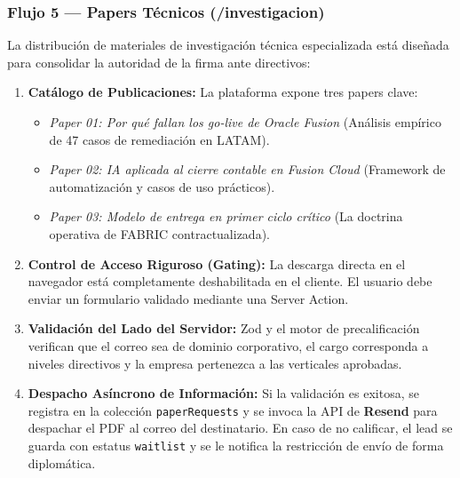 \documentclass[11pt,letterpaper]{article}
\begin{document}
\subsubsection{Flujo 5 — Papers Técnicos (/investigacion)}
La distribución de materiales de investigación técnica especializada está diseñada para consolidar la autoridad de la firma ante directivos:
\begin{enumerate}
\item \textbf{Catálogo de Publicaciones:} La plataforma expone tres papers clave:
  \begin{itemize}
  \item \emph{Paper 01: Por qué fallan los go-live de Oracle Fusion} (Análisis empírico de 47 casos de remediación en LATAM).
  \item \emph{Paper 02: IA aplicada al cierre contable en Fusion Cloud} (Framework de automatización y casos de uso prácticos).
  \item \emph{Paper 03: Modelo de entrega en primer ciclo crítico} (La doctrina operativa de FABRIC contractualizada).
  \end{itemize}
\item \textbf{Control de Acceso Riguroso (Gating):} La descarga directa en el navegador está completamente deshabilitada en el cliente. El usuario debe enviar un formulario validado mediante una Server Action.
\item \textbf{Validación del Lado del Servidor:} Zod y el motor de precalificación verifican que el correo sea de dominio corporativo, el cargo corresponda a niveles directivos y la empresa pertenezca a las verticales aprobadas.
\item \textbf{Despacho Asíncrono de Información:} Si la validación es exitosa, se registra en la colección \texttt{paperRequests} y se invoca la API de \textbf{Resend} para despachar el PDF al correo del destinatario. En caso de no calificar, el lead se guarda con estatus \texttt{waitlist} y se le notifica la restricción de envío de forma diplomática.
\end{enumerate}
\end{document}
